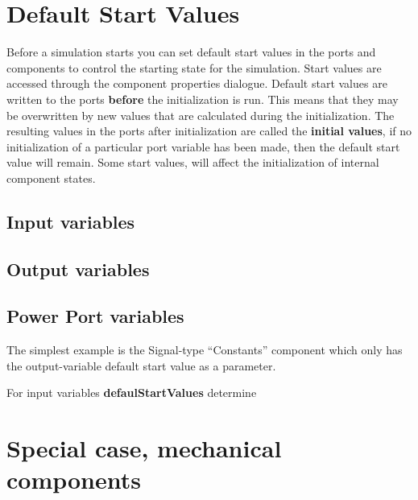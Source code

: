 \documentclass[a4paper,pdftex]{article}
\begin{document}
\section*{Default Start Values}
Before a simulation starts you can set default start values in the ports and components to control the starting state for the simulation.
Start values are accessed through the component properties dialogue.
Default start values are written to the ports \textbf{before} the initialization is run.
This means that they may be overwritten by new values that are calculated during the initialization.
The resulting values in the ports after initialization are called the \textbf{initial values}, if no initialization of a particular port variable has been made, then the default start value will remain.
Some start values, will affect the initialization of internal component states.


\subsection*{Input variables}

\subsection*{Output variables}

\subsection*{Power Port variables}

The simplest example is the Signal-type \enquote{Constants} component which only has the output-variable default start value as a parameter. 



For input variables \textbf{defaulStartValues} determine 


\section*{Special case, mechanical components}
\end{document}
